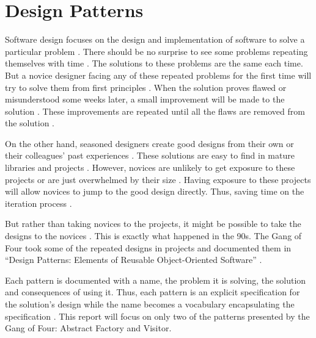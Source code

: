 \section{Design Patterns}
Software design focuses on the design and implementation of software to solve a particular problem \cite{ieee_1016-2009, satzinger_15_01}.
There should be no surprise to see some problems repeating themselves with time \cite{keshvari_11_01}.
The solutions to these problems are the same each time.
But a novice designer facing any of these repeated problems for the first time will try to solve them from first principles \cite{gamma_94_01, sonnentag_98_01}.
When the solution proves flawed or misunderstood some weeks later, a small improvement will be made to the solution \cite{zhu_05_01, ieee_1016-2009}.
These improvements are repeated until all the flaws are removed from the solution \cite{stephens_15_01, satzinger_15_01}.

On the other hand, seasoned designers create good designs from their own or their colleagues' past experiences \cite{sonnentag_98_01}.
These solutions are easy to find in mature libraries and projects \cite{gamma_94_01}.
However, novices are unlikely to get exposure to these projects \cite{zhu_05_01} or are just overwhelmed by their size \cite{hu_18_01}.
Having exposure to these projects will allow novices to jump to the good design directly.
Thus, saving time on the iteration process \cite{satzinger_15_01}.

But rather than taking novices to the projects, it might be possible to take the designs to the novices \cite{kim_03_01}.
This is exactly what happened in the 90s.
The Gang of Four took some of the repeated designs in projects and documented them in ``Design Patterns: Elements of Reusable Object-Oriented Software'' \cite{gamma_94_01}.


Each pattern is documented with a name, the problem it is solving, the solution and consequences of using it.
Thus, each pattern is an explicit specification for the solution's design while the name becomes a vocabulary encapsulating the specification \cite{gamma_94_01, bulajic_12_01}.
This report will focus on only two of the patterns presented by the Gang of Four: Abstract Factory and Visitor.



